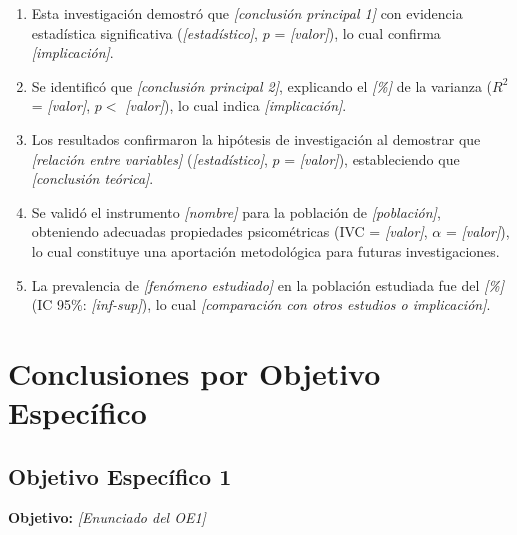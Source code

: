 \begin{enumerate}
    \item Esta investigación demostró que \textit{[conclusión principal 1]} con evidencia estadística significativa (\textit{[estadístico]}, $p$ = \textit{[valor]}), lo cual confirma \textit{[implicación]}.
    
    \item Se identificó que \textit{[conclusión principal 2]}, explicando el \textit{[\%]} de la varianza ($R^2$ = \textit{[valor]}, $p < $ \textit{[valor]}), lo cual indica \textit{[implicación]}.
    
    \item Los resultados confirmaron la hipótesis de investigación al demostrar que \textit{[relación entre variables]} (\textit{[estadístico]}, $p$ = \textit{[valor]}), estableciendo que \textit{[conclusión teórica]}.
    
    \item Se validó el instrumento \textit{[nombre]} para la población de \textit{[población]}, obteniendo adecuadas propiedades psicométricas (IVC = \textit{[valor]}, $\alpha$ = \textit{[valor]}), lo cual constituye una aportación metodológica para futuras investigaciones.
    
    \item La prevalencia de \textit{[fenómeno estudiado]} en la población estudiada fue del \textit{[\%]} (IC 95\%: \textit{[inf-sup]}), lo cual \textit{[comparación con otros estudios o implicación]}.
\end{enumerate}

\section{Conclusiones por Objetivo Específico}
\label{sec:conclusiones_por_objetivo}


\subsection{Objetivo Específico 1}
\label{subsec:conclusion_oe1}

\textbf{Objetivo:} \textit{[Enunciado del OE1]}

